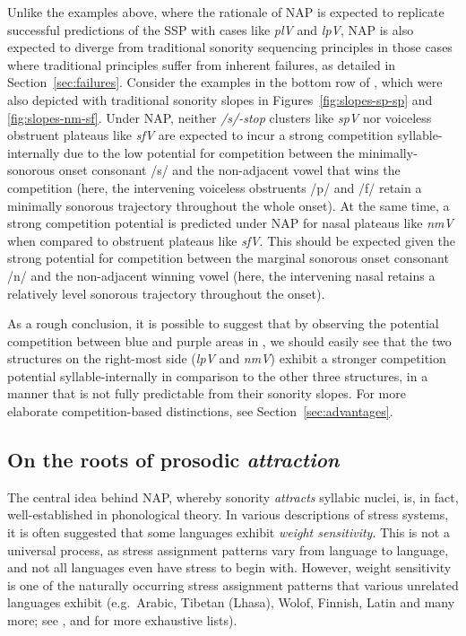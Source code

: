 Unlike the examples above, where the rationale of NAP is expected to replicate successful predictions of the SSP with cases like \emph{plV} and \emph{lpV}, NAP is also expected to diverge from traditional sonority sequencing principles in those cases where traditional principles suffer from inherent failures, as detailed in Section~\ref{sec:failures}.
Consider the examples in the bottom row of , which were also depicted with traditional sonority slopes in Figures~\ref{fig:slopes-sp-sp} and \ref{fig:slopes-nm-sf}.
Under NAP, neither \emph{/s/-stop} clusters like \emph{spV} nor voiceless obstruent plateaus like \emph{sfV} are expected to incur a strong competition syllable-internally due to the low potential for competition between the minimally-sonorous onset consonant /s/ and the non-adjacent vowel that wins the competition (here, the intervening voiceless obstruents /p/ and /f/ retain a minimally sonorous trajectory throughout the whole onset).
At the same time, a strong competition potential is predicted under NAP for nasal plateaus like \emph{nmV} when compared to obstruent plateaus like \emph{sfV}. This should be expected given the strong potential for competition between the marginal sonorous onset consonant /n/ and the non-adjacent winning vowel (here, the intervening nasal retains a relatively level sonorous trajectory throughout the onset).


As a rough conclusion, it is possible to suggest that by observing the potential competition between blue and purple areas in , we should easily see that the two structures on the right-most side (\emph{lpV} and \emph{nmV}) exhibit a stronger competition potential syllable-internally in comparison to the other three structures, in a manner that is not fully predictable from their sonority slopes. For more elaborate competition-based distinctions, see Section~\ref{sec:advantages}.

\subsection{\texorpdfstring{On the roots of prosodic \emph{attraction}}{On the roots of prosodic attraction}}\label{sec:attraction}

The central idea behind NAP, whereby sonority \emph{attracts} syllabic nuclei, is, in fact, well-established in phonological theory.
In various descriptions of stress systems, it is often suggested that some languages exhibit \emph{weight sensitivity}.
This is not a universal process, as stress assignment patterns vary from language to language, and not all languages even have stress to begin with. However, weight sensitivity is one of the naturally occurring stress assignment patterns that various unrelated languages exhibit (e.g.~Arabic, Tibetan (Lhasa), Wolof, Finnish, Latin and many more; see \citealt{goedemans2013weight}, and \cite[23]{gordon2006syllableweight} for more exhaustive lists).

